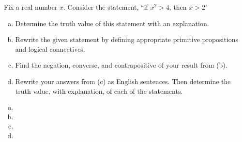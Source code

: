 \documentclass[11pt,letterpaper]{article}
\begin{document}
\newpage



 Fix a real number $x$. Consider the statement, ``if $x^2 > 4$, then $x > 2$'
	\begin{enumerate}[(a)]
	\item Determine the truth value of this statement with an explanation. 
	\item Rewrite the given statement by defining appropriate primitive propositions and logical connectives. 
	\item Find the negation, converse, and contrapositive of your result from (b).
	\item Rewrite your answers from (c) as English sentences. Then determine the truth value, with explanation, of each of the statements. 
	\end{enumerate} \pspace

\sol 
\begin{enumerate}[(a)]
\item 
\item 
\item 
\item 
\end{enumerate}
\end{document}
